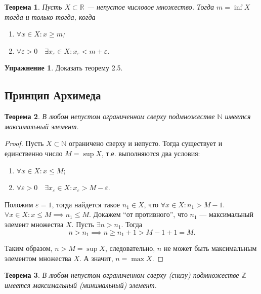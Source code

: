 \documentclass[a4paper,12pt]{article} %
\newtheorem{theorem}{Теорема}[section]
\theoremstyle{remark}
\theoremstyle{definition}
\newtheorem{exercise}{Упражнение}
\begin{document}
\begin{theorem}
    Пусть $X \subset \mathbb{R}$ --- непустое числовое множество. Тогда $m = \inf X$ тогда и только тогда, когда
    \begin{enumerate}
        \item $\forall x \in X : x \ge m$;
        \item $\forall \varepsilon>0 \quad \exists x_\varepsilon \in X : x_\varepsilon < m + \varepsilon$.
    \end{enumerate}
\end{theorem}

\begin{exercise}
    Доказать теорему 2.5.
\end{exercise}

\subsection{Принцип Архимеда}
\begin{theorem}
    В любом непустом ограниченном сверху подмножестве $\mathbb{N}$ имеется максимальный элемент.
\end{theorem}
\begin{proof}
    Пусть $X\subset \mathbb{N}$ ограничено сверху и непусто. Тогда существует и единственно число $M = \sup X$,
    т.е. выполняются два условия:
    \begin{enumerate}
        \item $\forall x \in X : x \le M$;
        \item $\forall \varepsilon>0 \quad \exists x_\varepsilon \in X : x_\varepsilon > M - \varepsilon$.
    \end{enumerate}

    Положим $\varepsilon = 1$, тогда найдется такое $n_1\in X$, что $\forall x \in X : n_1 > M - 1$. 
    $\forall x \in X : x \le M \implies n_1 \le M$. Докажем ``от противного'',
    что $n_1$ --- максимальный элемент множества $X$. Пусть $\exists n > n_1$. Тогда 
    \[n > n_1 \implies n \ge n_1 + 1 > M - 1 + 1 = M.\] 

    Таким образом, $n > M = \sup X$, следовательно, $n$ не может быть максимальным элементом множества $X$.
    А значит, $n = \max X$.
\end{proof}

\begin{theorem}
    В любом непустом ограниченном сверху (снизу) подмножестве $\mathbb{Z}$ имеется максимальный (минимальный) элемент.
\end{theorem}
\end{document}
